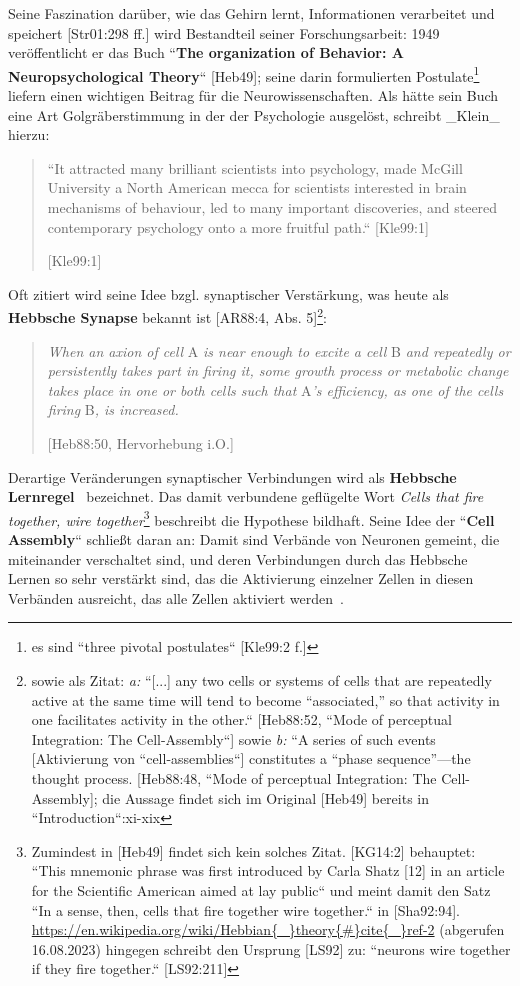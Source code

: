 Seine Faszination darüber, wie das Gehirn lernt, Informationen verarbeitet und speichert [Str01:298 ff.] wird Bestandteil seiner Forschungsarbeit: 1949 veröffentlicht er das Buch ``\textbf{The organization of Behavior: A Neuropsychological Theory}`` [Heb49]; seine darin formulierten Postulate\footnote{
    es sind ``three pivotal postulates`` {[Kle99:2 f.]}
} liefern einen wichtigen Beitrag für die Neurowissenschaften. Als hätte sein Buch eine Art Golgräberstimmung in der der Psychologie ausgelöst, schreibt _Klein_ hierzu:

\blockquote[{[Kle99:1]}]{
    ``It attracted many
    brilliant scientists into psychology, made McGill University a North American mecca for scientists interested in brain mechanisms of behaviour, led to many important discoveries, and steered contemporary psychology onto a more fruitful path.`` [Kle99:1]
}

Oft zitiert wird seine Idee bzgl. synaptischer Verstärkung, was heute als \textbf{Hebbsche Synapse} bekannt ist [AR88:4, Abs. 5]\footnote{
    sowie als Zitat: \textit{a:} ``[...] any two cells or systems of cells that are repeatedly active at the same time will tend to become “associated,” so that activity in one facilitates activity in the other.`` [Heb88:52, ``Mode of perceptual Integration: The Cell-Assembly``] sowie \textit{b:} ``A series of such events [Aktivierung von ``cell-assemblies``] constitutes a “phase sequence”—the thought process. [Heb88:48, ``Mode of perceptual Integration: The Cell-Assembly]; die Aussage findet sich im Original [Heb49] bereits in ``Introduction``:xi-xix
}:

\blockquote[{[Heb88:50, Hervorhebung i.O.]}]{
    \textit{When an axion of cell} A \textit{is near enough to excite a cell} B \textit{and repeatedly or persistently takes part in firing it, some growth process or metabolic change takes place in one or both cells such that} A\textit{'s efficiency, as one of the cells firing} B\textit{, is increased.}
}


Derartige Veränderungen synaptischer Verbindungen wird als \textbf{Hebbsche Lernregel}~\cite[985]{BCP18} bezeichnet.
Das damit verbundene geflügelte Wort \textit{Cells that fire together, wire together}\footnote{
    Zumindest in [Heb49] findet sich kein solches Zitat. [KG14:2] behauptet: ``This mnemonic phrase was first introduced by Carla Shatz [12] in an article for the Scientific American aimed at lay public`` und meint damit den Satz ``In a sense, then, cells that fire together wire together.`` in [Sha92:94]. \url{https://en.wikipedia.org/wiki/Hebbian{\_}theory{\#}cite{\_}ref-2} (abgerufen 16.08.2023) hingegen schreibt den Ursprung [LS92] zu: ``neurons wire together if they fire together.`` [LS92:211]
} beschreibt die Hypothese bildhaft.
Seine Idee der ``\textbf{Cell Assembly}`` schließt daran an: Damit sind Verbände von Neuronen gemeint, die miteinander verschaltet sind, und deren Verbindungen durch das Hebbsche Lernen so sehr verstärkt sind, das die Aktivierung einzelner Zellen in diesen Verbänden ausreicht, das alle Zellen aktiviert werden~\cite[907 f.]{BCP18}.


